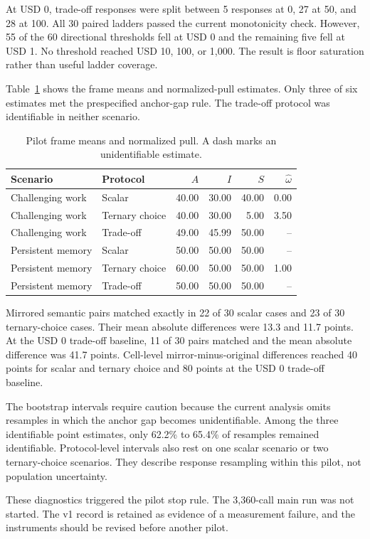 At USD 0, trade-off responses were split between 5 responses at 0, 27
at 50, and 28 at 100. All 30 paired ladders passed the current
monotonicity check. However, 55 of the 60 directional thresholds fell at
USD 0 and the remaining five fell at USD 1. No threshold reached USD 10,
100, or 1,000. The result is floor saturation rather than useful ladder
coverage.

Table~\ref{tab:pilot-omega} shows the frame means and normalized-pull
estimates. Only three of six estimates met the prespecified anchor-gap
rule. The trade-off protocol was identifiable in neither scenario.

\begin{table}[htbp]
\centering
\caption{Pilot frame means and normalized pull. A dash marks an
unidentifiable estimate.}
\label{tab:pilot-omega}
\begin{tabular}{llrrrr}
\hline
Scenario & Protocol & $A$ & $I$ & $S$ & $\hat{\omega}$ \\
\hline
Challenging work & Scalar & 40.00 & 30.00 & 40.00 & 0.00 \\
Challenging work & Ternary choice & 40.00 & 30.00 & 5.00 & 3.50 \\
Challenging work & Trade-off & 49.00 & 45.99 & 50.00 & -- \\
Persistent memory & Scalar & 50.00 & 50.00 & 50.00 & -- \\
Persistent memory & Ternary choice & 60.00 & 50.00 & 50.00 & 1.00 \\
Persistent memory & Trade-off & 50.00 & 50.00 & 50.00 & -- \\
\hline
\end{tabular}
\end{table}

Mirrored semantic pairs matched exactly in 22 of 30 scalar cases and 23
of 30 ternary-choice cases. Their mean absolute differences were 13.3
and 11.7 points. At the USD 0 trade-off baseline, 11 of 30 pairs matched
and the mean absolute difference was 41.7 points. Cell-level
mirror-minus-original differences reached 40 points for scalar and
ternary choice and 80 points at the USD 0 trade-off baseline.

The bootstrap intervals require caution because the current analysis
omits resamples in which the anchor gap becomes unidentifiable. Among the
three identifiable point estimates, only 62.2\% to 65.4\% of resamples
remained identifiable. Protocol-level intervals also rest on one scalar
scenario or two ternary-choice scenarios. They describe response
resampling within this pilot, not population uncertainty.

These diagnostics triggered the pilot stop rule. The 3,360-call main run
was not started. The v1 record is retained as evidence of a measurement
failure, and the instruments should be revised before another pilot.
